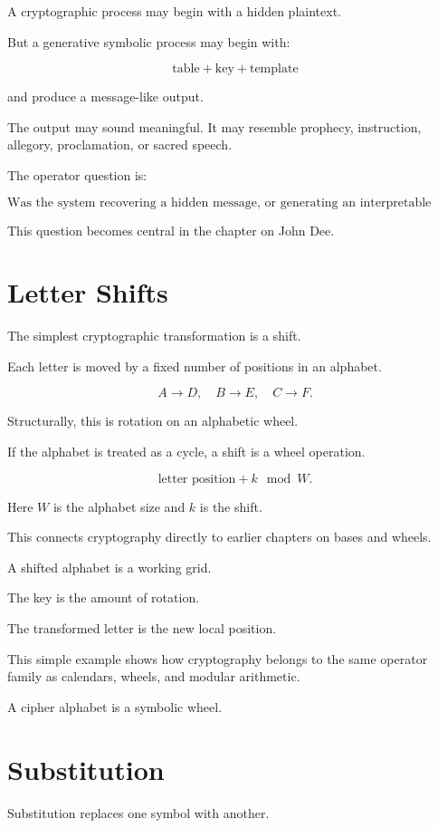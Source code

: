 \documentclass[11pt]{book}
\begin{document}
A cryptographic process may begin with a hidden plaintext.

But a generative symbolic process may begin with:

\[
\text{table} + \text{key} + \text{template}
\]

and produce a message-like output.

The output may sound meaningful. It may resemble prophecy, instruction, allegory, proclamation, or sacred speech.

The operator question is:

\[
\text{Was the system recovering a hidden message, or generating an interpretable utterance?}
\]

This question becomes central in the chapter on John Dee.

\section{Letter Shifts}

The simplest cryptographic transformation is a shift.

Each letter is moved by a fixed number of positions in an alphabet.

\[
A \rightarrow D,
\quad
B \rightarrow E,
\quad
C \rightarrow F.
\]

Structurally, this is rotation on an alphabetic wheel.

If the alphabet is treated as a cycle, a shift is a wheel operation.

\[
\text{letter position} + k \mod W.
\]

Here \(W\) is the alphabet size and \(k\) is the shift.

This connects cryptography directly to earlier chapters on bases and wheels.

A shifted alphabet is a working grid.

The key is the amount of rotation.

The transformed letter is the new local position.

This simple example shows how cryptography belongs to the same operator family as calendars, wheels, and modular arithmetic.

A cipher alphabet is a symbolic wheel.

\section{Substitution}

Substitution replaces one symbol with another.
\end{document}
